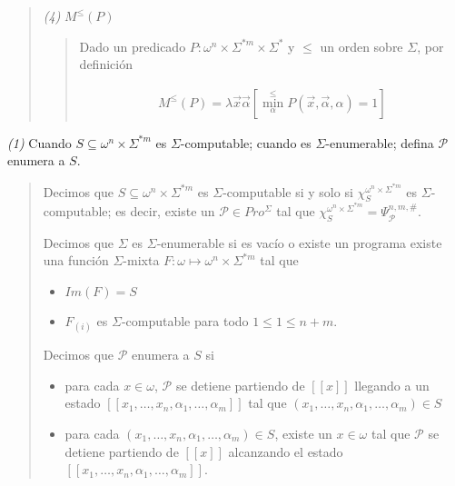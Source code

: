 \documentclass[a4paper, 12pt]{article}
\begin{document}
\begin{quote}
\begin{quote}
\end{quote}
\normalsize

\textit{(4)} $M^{\leq}(P)$


\small
\begin{quote}

Dado un predicado $P : \omega^{n} \times \Sigma^{*m} \times \Sigma^{*}$ y $\leq$
un orden sobre $\Sigma$, por definición 

\begin{align*}
    M^{\leq}(P) = \lambda \vec{x}\vec{\alpha} \left[ \min_{\alpha}^{\leq} P(\vec{x},
    \vec{\alpha}, \alpha) = 1  \right]
\end{align*}

\end{quote}
\normalsize



\end{quote}
\normalsize

\pagebreak 

\textit{(1)} Cuando $S \subseteq \omega^{n} \times \Sigma^{*m} $ es
$\Sigma$-computable; cuando es $\Sigma$-enumerable; defina $\mathcal{P}$ enumera
a $S$.


\small
\begin{quote}

Decimos que $S \subseteq \omega^{n} \times \Sigma^{*m} $ es $\Sigma$-computable
si y solo si $\chi_{S}^{\omega^{n} \times \Sigma^{*m} }$ es $\Sigma$-computable;
es decir, existe un $\mathcal{P} \in Pro^{\Sigma}$ tal que $\chi_{S}^{\omega^{n}
\times \Sigma^{*m} } = \Psi_{\mathcal{P}}^{n, m, \#} $.

Decimos que $\Sigma$ es $\Sigma$-enumerable si es vacío o existe un programa
existe una función $\Sigma$-mixta $F : \omega \mapsto \omega^{n} \times
\Sigma^{*m} $ tal que 

\begin{itemize}
    \item $Im(F) = S$ 
    \item $F_{(i)}$ es $\Sigma$-computable para todo $1 \leq 1 \leq n + m$.
\end{itemize}

Decimos que $\mathcal{P}$ enumera a $S$ si 

\begin{itemize}
    \item para cada $x \in  \omega$,
$\mathcal{P}$ se detiene partiendo de $[\![ x ]\!]$ llegando a un estado $[\![
x_1, \ldots, x_n, \alpha_1, \ldots, \alpha_m ]\!]$ tal que $(x_1, \ldots, x_n,
\alpha_1, \ldots, \alpha_m) \in S$ 
    \item para cada $(x_1, \ldots, x_n, \alpha_1, \ldots, \alpha_m) \in S$,
        existe un $x \in \omega$ tal que $\mathcal{P}$ se detiene partiendo de
        $[\![ x ]\!]$ alcanzando el estado $[\![ x_1, \ldots, x_n, \alpha_1,
        \ldots, \alpha_m ]\!]$.
\end{itemize}


\end{quote}
\normalsize
\end{document}
